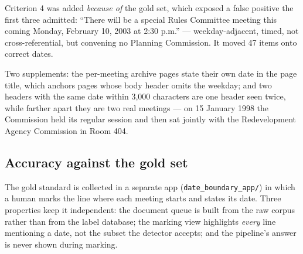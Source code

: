\documentclass[11pt]{article}
\begin{document}
Criterion 4 was added \emph{because of} the gold set, which exposed a false positive the
first three admitted: ``There will be a special Rules Committee meeting this coming Monday,
February 10, 2003 at 2:30 p.m.'' --- weekday-adjacent, timed, not cross-referential, but
convening no Planning Commission. It moved 47 items onto correct dates.

Two supplements: the per-meeting archive pages state their own date in the page title,
which anchors pages whose body header omits the weekday; and two headers with the same date
within 3{,}000 characters are one header seen twice, while farther apart they are two real
meetings --- on 15 January 1998 the Commission held its regular session and then sat
jointly with the Redevelopment Agency Commission in Room 404.

\subsection{Accuracy against the gold set}

The gold standard is collected in a separate app (\texttt{date\_boundary\_app/}) in which a
human marks the line where each meeting starts and states its date. Three properties keep
it independent: the document queue is built from the raw corpus rather than from the label
database; the marking view highlights \emph{every} line mentioning a date, not the subset
the detector accepts; and the pipeline's answer is never shown during marking.

\begin{table}[h]
\centering
{}
\caption{Date-assignment agreement. Rounds 2 and 3 were marked after the rules were frozen;
round 3 was a seeded random draw rather than a chosen month. Positional metrics match each
marked boundary to the nearest detected header of the same date within 4{,}000 characters.}
\end{table}
\end{document}
